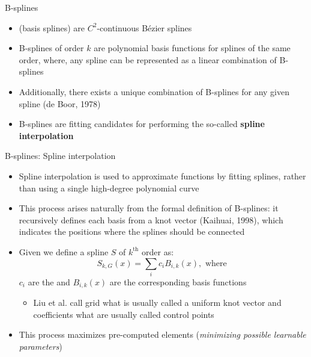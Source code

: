 \begin{frame}{B-splines}
    \begin{itemize}
        \item {} (basis splines) are $C^2$-continuous B\'ezier splines \vspace{0.5em}
        \item B-splines of order $k$ are polynomial basis functions for splines of the same order, where, any spline can be represented as a linear combination of B-splines  \vspace{0.5em}
        \item Additionally, there exists a unique combination of B-splines for any given spline (de Boor, 1978) \vspace{0.5em}
        \item B-splines are fitting candidates for performing the so-called \textbf{spline interpolation} \vspace{0.2em}
        \end{itemize}
\end{frame}

\begin{frame}{B-splines: Spline interpolation}
    \begin{itemize}
        \item Spline interpolation is used to approximate functions by fitting splines, rather than using a single high-degree polynomial curve \vspace{0.2em}
        \item This process arises naturally from the formal definition of B-splines: it recursively defines each basis from a knot vector (Kaihuai, 1998),
        which indicates the positions where the splines should be connected \vspace{0.2em}
        \item Given  we define a spline $S$ of $k^{\text{th}}$ order as:
            $$S_{k,G}(x) = \sum_i c_i B_{i,k}(x), \text{ where } $$
          $c_i$ are the  and $B_{i,k}(x)$ are the corresponding basis functions \vspace{0.2em}
          \begin{itemize}
            \item Liu et al. call grid what is usually called a uniform knot vector and coefficients what are usually called control points
          \end{itemize}
        \item This process maximizes pre-computed elements (\textit{minimizing possible learnable parameters})
    \end{itemize}
\end{frame}

